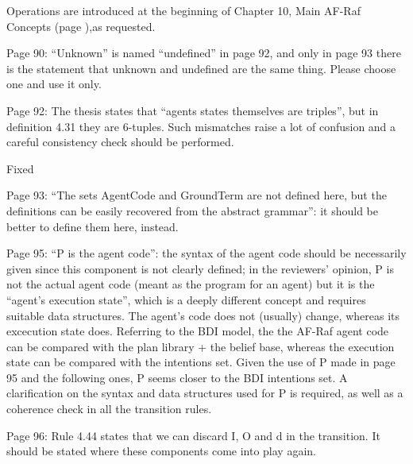 \documentclass{article}
\newcommand{\todo}[1]{[\textcolor{red}{TODO}: #1]}
\newenvironment{them}{\noindent\begingroup\color{blue}}{\endgroup\par}
\begin{document}
Operations are introduced at the beginning of Chapter 10, Main AF-Raf Concepts
(page ),as requested.

\begin{them}

Page 90:
“Unknown” is named “undefined” in page 92, and only in page 93 there is the
statement that unknown and undefined are the same thing. Please choose one and
use it only.

\end{them}
\todo{}

\begin{them}

Page 92:
The thesis states that “agents states themselves are triples”, but in
definition 4.31 they are 6-tuples.  Such mismatches raise a lot of confusion
and a careful consistency check should be performed.

\end{them}
Fixed

\begin{them}

Page 93:
“The sets AgentCode and GroundTerm are not defined here, but the definitions
can be easily recovered from the abstract grammar”: it should be better to
define them here, instead.

\end{them}
\todo{}

\begin{them}

Page 95:
“P is the agent code”: the syntax of the agent code should be necessarily given
since this component is not clearly defined; in the reviewers' opinion, P is
not the actual agent code (meant as the program for an agent) but it is the
“agent's execution state”, which is a deeply different concept and requires
suitable data structures. The agent's code does not (usually) change, whereas
its excecution state does. Referring to the BDI model, the the AF-Raf agent
code can be compared with the plan library + the belief base, whereas the
execution state can be compared with the intentions set. Given the use of P
made in page 95 and the following ones, P seems closer to the BDI intentions
set. A clarification on the syntax and data structures used for P is required,
as well as a coherence check in all the transition rules.

\end{them}
\todo{}

\begin{them}

Page 96:
Rule 4.44 states that we can discard I, O and d in the transition. It should be
stated where these components come into play again.

\end{them}
\todo{}
\end{document}

